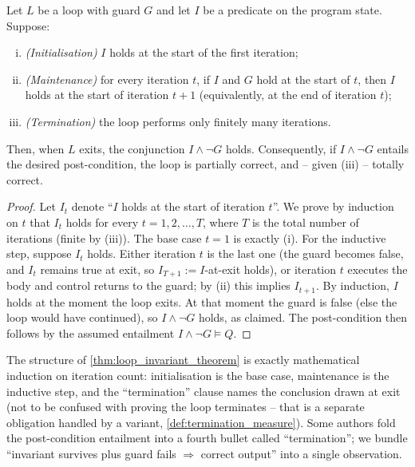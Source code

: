 \begin{theorem}
\label{thm:loop_invariant_theorem}
Let $L$ be a loop with guard $G$ and let $I$ be a predicate on the program state. Suppose:
\begin{enumerate}[(i)]
  \item \emph{(Initialisation)} $I$ holds at the start of the first iteration;
  \item \emph{(Maintenance)} for every iteration $t$, if $I$ and $G$ hold at the start of $t$, then $I$ holds at the start of iteration $t+1$ (equivalently, at the end of iteration $t$);
  \item \emph{(Termination)} the loop performs only finitely many iterations.
\end{enumerate}
Then, when $L$ exits, the conjunction $I \wedge \neg G$ holds. Consequently, if $I \wedge \neg G$ entails the desired post-condition, the loop is partially correct, and -- given (iii) -- totally correct.
\end{theorem}

\begin{proof}
Let $I_t$ denote ``$I$ holds at the start of iteration $t$''. We prove by induction on $t$ that $I_t$ holds for every $t = 1, 2, \dots, T$, where $T$ is the total number of iterations (finite by (iii)). The base case $t = 1$ is exactly (i). For the inductive step, suppose $I_t$ holds. Either iteration $t$ is the last one (the guard becomes false, and $I_t$ remains true at exit, so $I_{T+1} := I$-at-exit holds), or iteration $t$ executes the body and control returns to the guard; by (ii) this implies $I_{t+1}$. By induction, $I$ holds at the moment the loop exits. At that moment the guard is false (else the loop would have continued), so $I \wedge \neg G$ holds, as claimed. The post-condition then follows by the assumed entailment $I \wedge \neg G \models Q$.
\end{proof}

\begin{remark}
The structure of \cref{thm:loop_invariant_theorem} is exactly mathematical induction on iteration count: initialisation is the base case, maintenance is the inductive step, and the ``termination'' clause names the conclusion drawn at exit (not to be confused with proving the loop terminates -- that is a separate obligation handled by a variant, \cref{def:termination_measure}). Some authors fold the post-condition entailment into a fourth bullet called ``termination''; we bundle ``invariant survives plus guard fails $\Rightarrow$ correct output'' into a single observation.
\end{remark}

